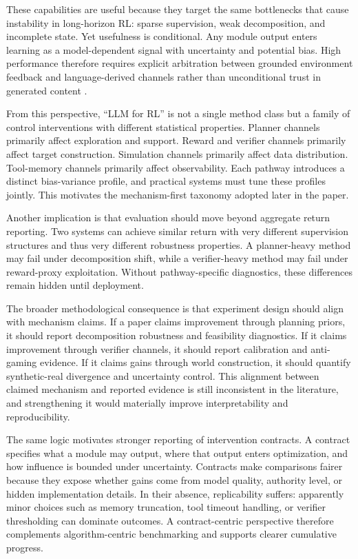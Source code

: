 ﻿\documentclass[conference]{IEEEtran}
\begin{document}
These capabilities are useful because they target the same bottlenecks that cause instability in long-horizon RL: sparse supervision, weak decomposition, and incomplete state. Yet usefulness is conditional. Any module output enters learning as a model-dependent signal with uncertainty and potential bias. High performance therefore requires explicit arbitration between grounded environment feedback and language-derived channels rather than unconditional trust in generated content \cite{arxiv_p_2602_06493,arxiv_p_2602_12579,arxiv_p_2601_06845,arxiv_p_2601_22511}.

From this perspective, ``LLM for RL'' is not a single method class but a family of control interventions with different statistical properties. Planner channels primarily affect exploration and support. Reward and verifier channels primarily affect target construction. Simulation channels primarily affect data distribution. Tool-memory channels primarily affect observability. Each pathway introduces a distinct bias-variance profile, and practical systems must tune these profiles jointly. This motivates the mechanism-first taxonomy adopted later in the paper.

Another implication is that evaluation should move beyond aggregate return reporting. Two systems can achieve similar return with very different supervision structures and thus very different robustness properties. A planner-heavy method may fail under decomposition shift, while a verifier-heavy method may fail under reward-proxy exploitation. Without pathway-specific diagnostics, these differences remain hidden until deployment.

The broader methodological consequence is that experiment design should align with mechanism claims. If a paper claims improvement through planning priors, it should report decomposition robustness and feasibility diagnostics. If it claims improvement through verifier channels, it should report calibration and anti-gaming evidence. If it claims gains through world construction, it should quantify synthetic-real divergence and uncertainty control. This alignment between claimed mechanism and reported evidence is still inconsistent in the literature, and strengthening it would materially improve interpretability and reproducibility.

The same logic motivates stronger reporting of intervention contracts. A contract specifies what a module may output, where that output enters optimization, and how influence is bounded under uncertainty. Contracts make comparisons fairer because they expose whether gains come from model quality, authority level, or hidden implementation details. In their absence, replicability suffers: apparently minor choices such as memory truncation, tool timeout handling, or verifier thresholding can dominate outcomes. A contract-centric perspective therefore complements algorithm-centric benchmarking and supports clearer cumulative progress.
\end{document}
